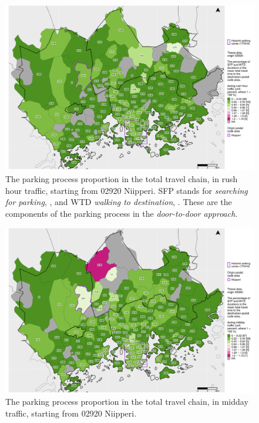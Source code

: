 \begin{figure}[H]%
    \centering
    \includegraphics[trim={0.9cm 0.3cm 0.25cm 0.3cm},clip,width=\textwidth]{images/compare_traveltimes_mapfill-msc_r_pct_fromzip-02920_28-09-2020.png}
    \caption[Parking process proportion from Niipperi, rush hour traffic]{The parking process proportion in the total travel chain, in rush hour traffic, starting from 02920 Niipperi. SFP stands for \textit{searching for parking}, , and WTD \textit{walking to destination}, . These are the components of the parking process in the \textit{door-to-door approach}.}%
    \label{fig:compare_msc_r_pct_02920}%
\end{figure}

\begin{figure}[H]%
    \centering
    \includegraphics[trim={0.9cm 0.3cm 0.25cm 0.3cm},clip,width=\textwidth]{images/compare_traveltimes_mapfill-msc_m_pct_fromzip-02920_28-09-2020.png}
    \caption[Parking process proportion from Niipperi, midday traffic]{The parking process proportion in the total travel chain, in midday traffic, starting from 02920 Niipperi.}%
    \label{fig:compare_msc_m_pct_02920}%
\end{figure}

